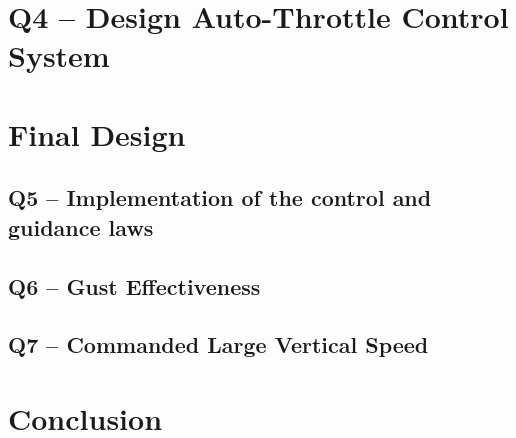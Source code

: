 \documentclass{UoNMCHA}
\numberwithin{equation}{section}
\begin{document}
\section{Q4 -- Design Auto-Throttle Control System}

\section{Final Design}

\subsection{Q5 -- Implementation of the control and guidance laws}

\subsection{Q6 -- Gust Effectiveness}

\subsection{Q7 -- Commanded Large Vertical Speed}


\section{Conclusion}
\newpage


\newpage
\appendix
\end{document}
